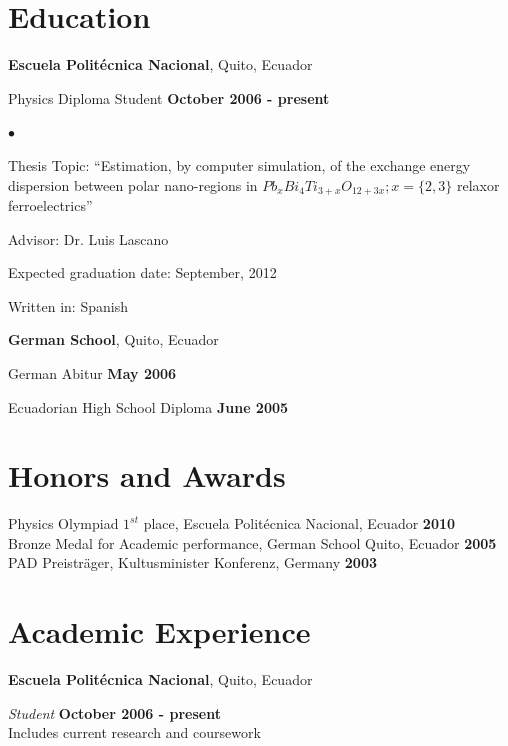 \documentclass[margin,line]{res}
\newenvironment{list1}{
  \begin{list}{\ding{113}}{%
      \setlength{\itemsep}{0in}
      \setlength{\parsep}{0in} \setlength{\parskip}{0in}
      \setlength{\topsep}{0in} \setlength{\partopsep}{0in} 
      \setlength{\leftmargin}{0.17in}}}{\end{list}}
\newenvironment{list2}{
  \begin{list}{$\bullet$}{%
      \setlength{\itemsep}{0in}
      \setlength{\parsep}{0in} \setlength{\parskip}{0in}
      \setlength{\topsep}{0in} \setlength{\partopsep}{0in} 
      \setlength{\leftmargin}{0.2in}}}{\end{list}}
\begin{document}
\begin{resume}
\section{\sc Education}
  {\bf Escuela Politécnica Nacional}, Quito, Ecuador\\
  \vspace{-.1in}
  \begin{list1}
    \item[] Physics Diploma Student \hfill {\bf October 2006 - present}\\
    \begin{list2}
    \vspace{-.1in}
      \item Thesis Topic:  ``Estimation, by computer simulation, of the exchange
	energy dispersion between polar nano-regions in $Pb_xBi_4Ti_{3+x}O_{12+3x}; x=\{2,3\}$
	relaxor ferroelectrics''
      \item Advisor: Dr. Luis Lascano
      \item Expected graduation date: September, 2012
      \item Written in: Spanish
    \end{list2}
  \end{list1}
  {\bf German School}, Quito, Ecuador\\
  \vspace{-.1in}
  \begin{list1}
    \item[] German Abitur \hfill {\bf May 2006}
    \item[] Ecuadorian High School Diploma \hfill {\bf June 2005}
  \end{list1}

\section{\sc Honors and Awards}
  Physics Olympiad $1^{st}$ place, Escuela Politécnica Nacional, Ecuador \hfill {\bf 2010}\\
  Bronze Medal for Academic performance, German School Quito, Ecuador \hfill {\bf 2005}\\
  PAD Preisträger, Kultusminister Konferenz, Germany \hfill {\bf 2003}

\section{\sc Academic Experience}
  {\bf Escuela Politécnica Nacional}, Quito, Ecuador

  \vspace{-.3cm}
  {\em Student} \hfill {\bf October 2006 - present}\\
  Includes current research and coursework


\end{resume}
\end{document}
